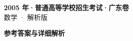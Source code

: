 \documentclass[zihao=-4, a4paper]{ctexart}
\begin{document}
\begin{center}
  {\Large\bfseries 2005 年·普通高等学校招生考试·广东卷}\\[4pt]
  {\large 数学 · 解析版}
\end{center}
\medskip
{}

\clearpage
{}
\begin{center}{\Large\bfseries 参考答案与详细解析}\end{center}
\medskip

\end{document}

